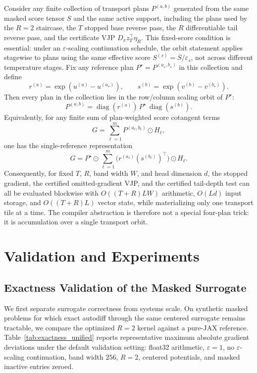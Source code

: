 \begin{proposition}\label{prop:orbit_certificate}
Consider any finite collection of transport plans $P^{(a,b)}$ generated from the same masked score tensor $S$ and the same active support, including the plans used by the $R=2$ staircase, the $T$ stopped base reverse pass, the $R$ differentiable tail reverse pass, and the certificate VJP $D_xz_T^\top\eta_R$. This fixed-score condition is essential: under an $\varepsilon$-scaling continuation schedule, the orbit statement applies stagewise to plans using the same effective score $S^{(s)}=\bar S/\varepsilon_s$, not across different temperature stages. Fix any reference plan $P^\star=P^{(a_\star,b_\star)}$ in this collection and define
\[
r^{(a)}=\exp(u^{(a)}-u^{(a_\star)}),
\qquad
s^{(b)}=\exp(v^{(b)}-v^{(b_\star)}).
\]
Then every plan in the collection lies in the row/column scaling orbit of $P^\star$:
\[
P^{(a,b)}
=
\operatorname{diag}(r^{(a)})\,P^\star\,\operatorname{diag}(s^{(b)}).
\]
Equivalently, for any finite sum of plan-weighted score cotangent terms
\[
G=\sum_{\ell=1}^m P^{(a_\ell,b_\ell)}\odot H_\ell ,
\]
one has the single-reference representation
\[
G
=
P^\star\odot
\sum_{\ell=1}^m
\bigl(r^{(a_\ell)}(s^{(b_\ell)})^\top\bigr)
\odot H_\ell .
\]
Consequently, for fixed $T$, $R$, band width $W$, and head dimension $d$, the stopped gradient, the certified omitted-gradient VJP, and the certified tail-depth test can all be evaluated blockwise with $O((T+R)LW)$ arithmetic, $O(Ld)$ input storage, and $O((T+R)L)$ vector state, while materializing only one transport tile at a time. The compiler abstraction is therefore not a special four-plan trick: it is accumulation over a single transport orbit.
\end{proposition}

\section{Validation and Experiments}

\subsection{Exactness Validation of the Masked Surrogate}

We first separate surrogate correctness from systems scale. On synthetic masked problems for which exact autodiff through the same centered surrogate remains tractable, we compare the optimized $R=2$ kernel against a pure-JAX reference. Table~\ref{tab:exactness_unified} reports representative maximum absolute gradient deviations under the default validation setting: float32 arithmetic, $\varepsilon=1$, no $\varepsilon$-scaling continuation, band width $256$, $R=2$, centered potentials, and masked inactive entries zeroed.

